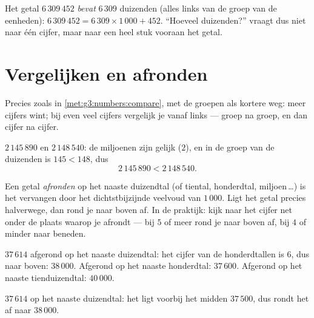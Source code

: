 \begin{example}\label{ex:g4:numbers:contained}
Het getal $6\,309\,452$ \emph{bevat} $6\,309$ duizenden (alles links van
de groep van de eenheden): $6\,309\,452 = 6\,309 \times 1\,000 + 452$.
``Hoeveel duizenden?'' vraagt dus niet naar één cijfer, maar naar een heel
stuk vooraan het getal.
\end{example}

\section{Vergelijken en afronden}

\begin{method}\label{met:g4:numbers:compare}
Precies zoals in \cref{met:g3:numbers:compare}, met de groepen als
kortere weg: meer cijfers wint; bij even veel cijfers vergelijk je vanaf
links --- groep na groep, en dan cijfer na cijfer.
\end{method}

\begin{example}\label{ex:g4:numbers:compare}
$2\,145\,890$ en $2\,148\,540$: de miljoenen zijn gelijk ($2$), en in de
groep van de duizenden is $145 < 148$, dus
\[
2\,145\,890 < 2\,148\,540 .
\]
\end{example}

\begin{definition}[Afronden]\label{def:g4:numbers:round}
Een getal \emph{afronden} op het naaste duizendtal (of
tiental, honderdtal, miljoen\,\dots) is het vervangen door het
dichtstbijzijnde veelvoud van $1\,000$. Ligt het getal precies
halverwege, dan rond je naar boven af. In de praktijk: kijk naar het
cijfer net onder de plaats waarop je afrondt --- bij $5$ of meer rond je
naar boven af, bij $4$ of minder naar beneden.
\end{definition}

\begin{example}\label{ex:g4:numbers:round}
$37\,614$ afgerond op het naaste duizendtal: het cijfer van de
honderdtallen is $6$, dus naar boven: $38\,000$. Afgerond op het naaste
honderdtal: $37\,600$. Afgerond op het naaste tienduizendtal: $40\,000$.
\end{example}

\begin{omfigure}

{\small $37\,614$  op het naaste duizendtal: het ligt voorbij het
midden $37\,500$, dus rondt het af naar $38\,000$.}
\end{omfigure}

